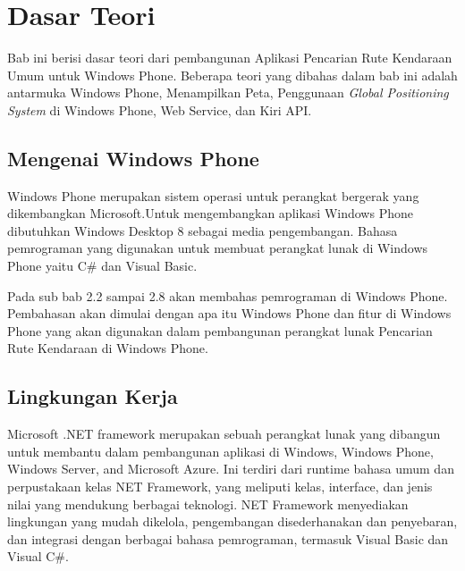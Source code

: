 \chapter{Dasar Teori}
\label{chap:teori}
Bab ini berisi dasar teori dari pembangunan Aplikasi Pencarian Rute Kendaraan Umum untuk Windows Phone. Beberapa teori yang dibahas dalam bab ini  adalah antarmuka Windows Phone, Menampilkan Peta, Penggunaan \textit{Global Positioning System} di Windows Phone, Web Service, dan Kiri API. 

\section{Mengenai Windows Phone}
\label{sec:Mengenai Windows Phone}
\hspace{0.5cm} Windows Phone merupakan sistem operasi untuk perangkat bergerak yang dikembangkan Microsoft.\footnotemark[1] Untuk mengembangkan aplikasi Windows Phone dibutuhkan Windows Desktop 8 sebagai media pengembangan. Bahasa pemrograman yang digunakan untuk membuat perangkat lunak di Windows Phone yaitu C\# dan Visual Basic.  

\hspace{0.5cm} Pada sub bab 2.2 sampai 2.8 akan membahas pemrograman di Windows Phone. Pembahasan akan dimulai dengan apa itu Windows Phone dan fitur di Windows Phone yang akan digunakan dalam pembangunan perangkat lunak Pencarian Rute Kendaraan di Windows Phone. 

\section{Lingkungan Kerja}
\label{sec:Lingkungan Kerja}
\hspace{0.5cm} Microsoft .NET framework merupakan sebuah perangkat lunak yang dibangun untuk membantu dalam pembangunan aplikasi di Windows, Windows Phone, Windows Server, and Microsoft Azure\cite{MSDN}. Ini terdiri dari runtime bahasa umum dan perpustakaan kelas NET Framework, yang meliputi kelas, interface, dan jenis nilai yang mendukung berbagai teknologi. NET Framework menyediakan lingkungan yang mudah dikelola, pengembangan disederhanakan dan penyebaran, dan integrasi dengan berbagai bahasa pemrograman, termasuk Visual Basic dan Visual C\#.

